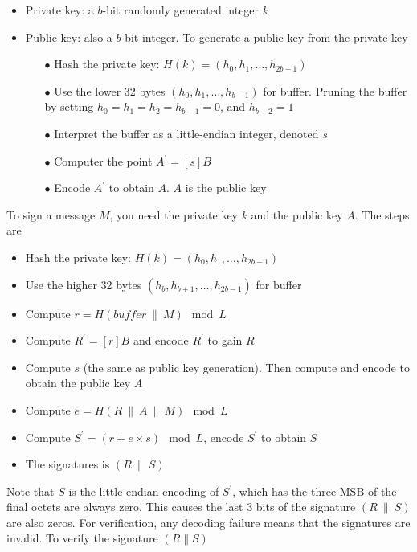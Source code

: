 \begin{itemize}
  \item Private key: a $b$-bit randomly generated integer $k$
  \item Public key: also a $b$-bit integer. To generate a public key from the private key

        \begin{itemize}
          \item[$\bullet$] Hash the private key: $H(k) = (h_0, h_1, \dotso , h_{2b-1})$
          \item[$\bullet$] Use the lower 32 bytes $(h_0, h_1, \dotso , h_{b-1})$ for buffer. Pruning the buffer by setting $h_0 = h_1 = h_2= h_{b-1} = 0$, and $h_{b-2} = 1$
          \item[$\bullet$] Interpret the buffer as a little-endian integer, denoted $s$
          \item[$\bullet$] Computer the point $A^\prime = [s]B$
          \item[$\bullet$] Encode $A^\prime$ to obtain $A$. $A$ is the public key
        \end{itemize}

\end{itemize}

To sign a message $M$, you need the private key $k$ and the public key $A$. The steps are

\begin{itemize}
  \item Hash the private key:  $H(k) = (h_0, h_1 ,\dotso, h_{2b-1})$
  \item Use the higher 32 bytes $(h_b, h_{b+1},\dotso, h_{2b-1})$ for buffer
  \item Compute $r = H(buffer \ \| \ M) \mod L$
  \item Compute $R^\prime = [r]B$ and encode $R^\prime$ to gain $R$
  \item Compute $s$ (the same as public key generation). Then compute and encode to obtain the public key $A$
  \item Compute $e = H(R \ \| \ A \ \| \ M) \mod L$
  \item Compute $S^\prime = (r+e \times s) \mod L$, encode $S^\prime$ to obtain $S$
  \item The signatures is $(R \ \| \ S)$
\end{itemize}

Note that $S$ is the little-endian encoding of $S^\prime$, which has the three MSB of the final octets are always zero. This causes the last 3 bits of the signature $(R \ \| \ S)$ are also zeros. For verification, any decoding failure means that the signatures are invalid. To verify the signature $(R \| S)$\\

